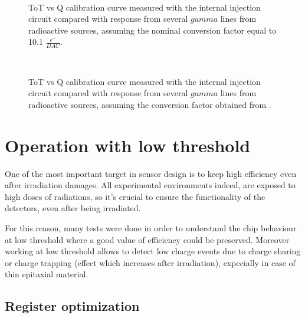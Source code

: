 

\begin{figure}
\centering
{}\quad
{}\\
\caption{ToT vs Q calibration curve measured with the internal injection circuit compared with response from several $gamma$ lines from radioactive sources, assuming the nominal conversion factor equal to 10.1 $\frac{e^{-}}{DAC}$.}
\label{fig:inj_cap_10}
\end{figure} 


\begin{figure}[h!]
\centering
{}\quad
{}\\
\caption{ToT vs Q calibration curve measured with the internal injection circuit compared with response from several $gamma$ lines from radioactive sources, assuming the conversion factor obtained from .}
\label{fig:inj_cap_sources}
\end{figure} 




\section{Operation with low threshold}

One of the most important target in sensor design is to keep high efficiency even after irradiation damages. All experimental environments indeed, are exposed to high doses of radiations, so it's crucial to ensure the functionality of the detectors, even after being irradiated.

For this reason, many tests were done in order to understand the chip behaviour at low threshold where a good value of efficiency could be preserved.
Moreover working at low threshold allows to detect low charge events due to charge sharing or charge trapping (effect which increases after irradiation), expecially in case of thin epitaxial material. 


\subsection{Register optimization}

